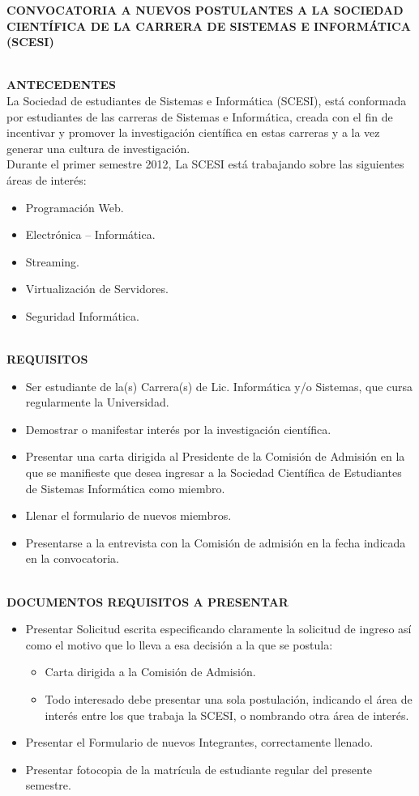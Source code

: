 \documentclass[11pt,letterpaper]{article}
\begin{document}
\begin{center}
{\bf \Large CONVOCATORIA A NUEVOS POSTULANTES A LA SOCIEDAD CIENTÍFICA DE LA CARRERA DE SISTEMAS E INFORMÁTICA
(SCESI)}\\
\end{center}
~\\
{\bf \small ANTECEDENTES}\\

La Sociedad de estudiantes de Sistemas e Informática (SCESI), está conformada por estudiantes de las carreras de Sistemas e Informática, creada con el fin de incentivar y promover la investigación científica en estas carreras y a la vez generar una cultura de investigación.\\

Durante el primer semestre 2012, La SCESI está trabajando sobre las siguientes áreas de interés:
\begin{itemize}
\item Programación Web.
\item Electrónica – Informática.
\item Streaming.
\item Virtualización de Servidores.
\item Seguridad Informática.
\end{itemize}
~\\
{\bf \small REQUISITOS}
\begin{itemize}
\item[a.] Ser estudiante de la(s) Carrera(s) de Lic. Informática y/o Sistemas, que cursa regularmente la Universidad.
\item[b.] Demostrar o manifestar interés por la investigación científica.
\item[c.] Presentar una carta dirigida al Presidente de la Comisión de Admisión en la que se manifieste que desea ingresar a la Sociedad Científica de Estudiantes de Sistemas Informática como miembro.
\item[d.] Llenar el formulario de nuevos miembros.
\item[e.] Presentarse a la entrevista con la Comisión de admisión en la fecha indicada en la convocatoria.
\end{itemize}
~\\
{\bf \small DOCUMENTOS REQUISITOS A PRESENTAR}
\begin{itemize}
\item[a.] Presentar Solicitud escrita especificando claramente la solicitud de ingreso así como el motivo que lo lleva a esa decisión a la que se postula:
\begin{itemize}
\item Carta dirigida a la Comisión de Admisión.
\item Todo interesado debe presentar una sola postulación, indicando el área de interés entre los que  trabaja la SCESI, o nombrando otra área de interés.
\end{itemize}
\item[b.] Presentar el Formulario de nuevos Integrantes, correctamente llenado.
\item[c.] Presentar fotocopia de la matrícula de estudiante regular del presente semestre.
\end{itemize}
\end{document}
